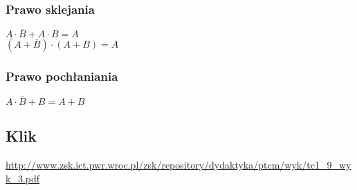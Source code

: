 \subsubsection{Prawo sklejania}

$A\cdot\overline{B}+A\cdot B=A$\\[4px]
$(A+\overline{B})\cdot(A+B)=A$

\subsubsection{Prawo pochłaniania}

$ A\cdot\overline{B}+B=A+B$

\subsection{Klik}

\url{http://www.zsk.ict.pwr.wroc.pl/zsk/repository/dydaktyka/ptcm/wyk/tc1_9_wyk_3.pdf}